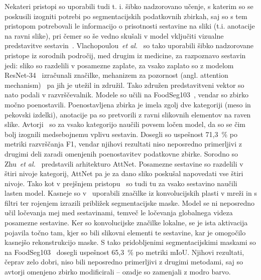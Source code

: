 \documentclass[a4paper,twoside,openright,12pt,slovene]{book}
\newcommand{\etal}{\textit{et al.}} %
\begin{document}
            Nekateri pristopi so uporabili tudi t. i. šibko nadzorovano učenje,
            s katerim so se poskusili izogniti potrebi po segmentacijskih
            podatkovnih zbirkah, saj so s tem pristopom potrebovali le
            informacijo o prisotnosti sestavine na sliki (t.i. anotacije na
            ravni slike), pri čemer so še vedno skušali v model vključiti
            vizualne predstavitve sestavin~\cite{src:zhu2023new}.
            Vlachopoulou~\etal~\cite{src:vlachopoulou2023food} so tako
            uporabili šibko nadzorovane pristope iz sorodnih področij, med
            drugim iz medicine, za razpoznavo sestavin jedi: sliko so razdelili v
            posamezne zaplate, za vsako zaplato so z
            modelom ResNet-34~\cite{src:he2016deep} izračunali značilke, mehanizem za
            pozornost (angl. attention mechanism)~\cite{src:ilse2018attention}
            pa jih je utežil in združil. Tako združen predstavitveni vektor so
            nato podali v razvrščevalnik. Modele so učili na
            FoodSeg103~\cite{src:bossard2014food}, vendar so zbirko močno
            poenostavili. Poenostavljena zbirka je imela zgolj dve kategoriji
            (meso in pekovski izdelki), anotacije pa so pretvorili z ravni slikovnih elementov na raven slike.
            Avtorji~\cite{src:vlachopoulou2023food} so za vsako kategorijo
            naučili povsem ločen model, da so se čim bolj izognili medsebojnemu
            vplivu sestavin. Dosegli so uspešnost 71{,}3~\% po metriki
            razvrščanja F1, vendar njihovi rezultati niso neposredno
            primerljivi z drugimi deli zaradi omenjenih poenostavitev
            podatkovne zbirke.
            Sorodno so Zhu~\etal~\cite{src:zhu2023new} predstavili arhitekturo
            AttNet. Posamezne sestavine so razdelili v štiri nivoje kategorij,
            AttNet pa je za dano sliko poskušal napovedati vse štiri nivoje.
            Tako kot v prejšnjem pristopu~\cite{src:vlachopoulou2023food} so
            tudi tu za vsako sestavino naučili lasten model. Kasneje so
            v~\cite{src:zhu2023new} uporabili značilke iz konvolucijskih plasti
            v mreži in s filtri ter rojenjem izrazili približek segmentacijske
            maske. Model se ni neposredno učil ločevanja mej med sestavinami,
            temveč le ločevanja globalnega videza posamezne sestavine. Ker so
            konvolucijske značilke lokalne, se je ista aktivacija pojavila
            točno tam, kjer so bili slikovni elementi te sestavine, kar je
            omogočilo kasnejšo rekonstrukcijo maske. S tako pridobljenimi
            segmentacijskimi maskami so na FoodSeg103~\cite{src:wu2021large}
            dosegli uspešnost 65{,}3~\% po metriki mIoU. Njihovi rezultati,
            čeprav zelo dobri, niso bili neposredno primerljivi z drugimi
            metodami, saj so avtorji omenjeno zbirko modificirali -- ozadje so
            zamenjali
            z modro barvo. %
\end{document}
